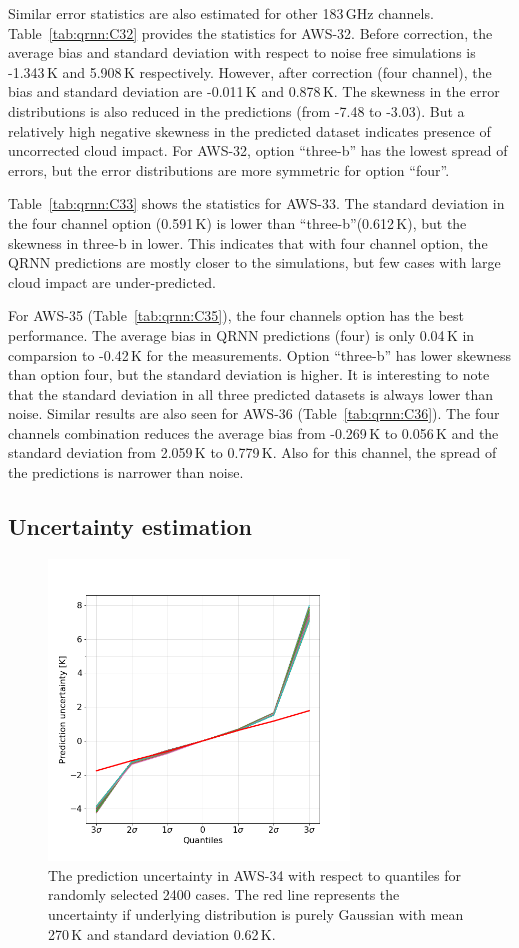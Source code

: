 \documentclass[12pt]{article}
\begin{document}
Similar error statistics are also estimated for other 183\,GHz channels.
Table~\ref{tab:qrnn:C32} provides the statistics for AWS-32. Before correction,
the average bias and standard deviation with respect to noise free simulations
is -1.343\,K and 5.908\,K respectively. However, after correction (four
channel), the bias and standard deviation are -0.011\,K and 0.878\,K. The
skewness in the error distributions is also reduced in the predictions (from
-7.48 to -3.03). But a relatively high negative skewness in the predicted
dataset indicates presence of uncorrected cloud impact. For AWS-32, option
``three-b'' has the lowest spread of errors, but the error distributions are
more symmetric for option ``four''.

Table~\ref{tab:qrnn:C33} shows the statistics for AWS-33. The standard
deviation in the four channel option (0.591\,K) is lower than
``three-b''(0.612\,K), but the skewness in three-b in lower. This indicates
that with four channel option, the QRNN predictions are mostly closer to the
simulations, but few cases with large cloud impact are under-predicted.

For AWS-35 (Table~\ref{tab:qrnn:C35}), the four channels option has the best performance. The average bias in QRNN predictions (four) is only 0.04\,K in comparsion to -0.42\,K for the measurements. Option ``three-b'' has lower skewness than option four, but the standard deviation is higher. It is interesting to note that the standard deviation in all three predicted datasets is always lower than noise. Similar results are also seen for AWS-36 (Table~\ref{tab:qrnn:C36}). The four channels combination reduces the average bias from -0.269\,K to 0.056\,K and the standard deviation from 2.059\,K to 0.779\,K. Also for this channel, the spread of the predictions is narrower than noise.  

\subsection{Uncertainty estimation}
%
\begin{figure}[!tb]
	\centering
	\includegraphics[height=80mm]{prediction_uncertainty.png}
	\caption{The prediction uncertainty in AWS-34 with respect to quantiles for randomly selected 2400 cases. The red line represents the uncertainty if underlying distribution is purely Gaussian with mean 270\,K and standard deviation 0.62\,K. }
	\label{fig:prediction_uncertainty}
\end{figure}
\end{document}
